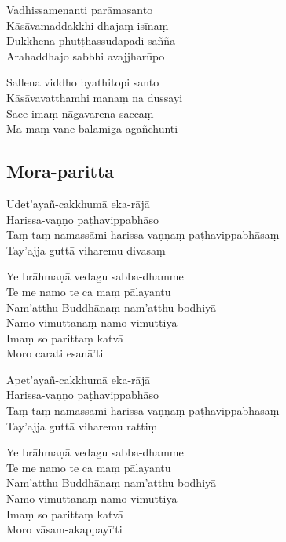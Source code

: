 

\begin{paritta}

Vadhissamenanti parāmasanto\\
Kāsāvamaddakkhi dhajaṃ isīnaṃ\\
Dukkhena phuṭṭhassudapādi saññā\\
Arahaddhajo sabbhi avajjharūpo

Sallena viddho byathitopi santo\\
Kāsāvavatthamhi manaṃ na dussayi\\
Sace imaṃ nāgavarena saccaṃ\\
Mā maṃ vane bālamigā agañchunti
\end{paritta}

\subsection{Mora-paritta}
\label{udetayan-cakkhuma}



Udet'ayañ-cakkhumā eka-rājā\\
Harissa-vaṇṇo paṭhavippabhāso\\
Taṃ taṃ namassāmi harissa-vaṇṇaṃ paṭhavippabhāsaṃ\\
Tay'ajja guttā viharemu divasaṃ

Ye brāhmaṇā vedagu sabba-dhamme\\
Te me namo te ca maṃ pālayantu\\
Nam'atthu Buddhānaṃ nam'atthu bodhiyā\\
Namo vimuttānaṃ namo vimuttiyā\\
Imaṃ so parittaṃ katvā\\
Moro carati esanā'ti


Apet'ayañ-cakkhumā eka-rājā\\
Harissa-vaṇṇo paṭhavippabhāso\\
Taṃ taṃ namassāmi harissa-vaṇṇaṃ paṭhavippabhāsaṃ\\
Tay'ajja guttā viharemu rattiṃ

Ye brāhmaṇā vedagu sabba-dhamme\\
Te me namo te ca maṃ pālayantu\\
Nam'atthu Buddhānaṃ nam'atthu bodhiyā\\
Namo vimuttānaṃ namo vimuttiyā\\
Imaṃ so parittaṃ katvā\\
Moro vāsam-akappayī'ti

